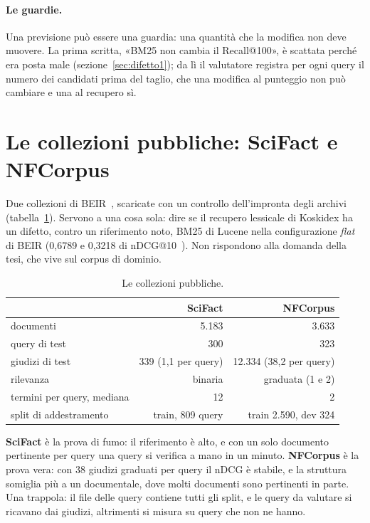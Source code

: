 \paragraph{Le guardie.} Una previsione può essere una guardia: una quantità che la
modifica non deve muovere. La prima scritta, «BM25 non cambia il Recall@100», è
scattata perché era posta male (sezione~\ref{sec:difetto1}); da lì il valutatore
registra per ogni query il numero dei candidati prima del taglio, che una modifica
al punteggio non può cambiare e una al recupero sì.

\section{Le collezioni pubbliche: SciFact e NFCorpus}\label{sec:collezioni}

Due collezioni di BEIR~\cite{thakur2021beir}, scaricate con un controllo
dell'impronta degli archivi (tabella~\ref{tab:collezioni}). Servono a una cosa
sola: dire se il recupero lessicale di Koskidex ha un difetto, contro un
riferimento noto, BM25 di Lucene nella configurazione \emph{flat} di BEIR
(0,6789 e 0,3218 di nDCG@10~\cite{pyserini2cr}). Non rispondono alla domanda
della tesi, che vive sul corpus di dominio.

\begin{table}[ht]
  \centering
  \begin{tabular}{lrr}
    \toprule
    & SciFact & NFCorpus \\
    \midrule
    documenti & 5.183 & 3.633 \\
    query di test & 300 & 323 \\
    giudizi di test & 339 (1,1 per query) & 12.334 (38,2 per query) \\
    rilevanza & binaria & graduata (1 e 2) \\
    termini per query, mediana & 12 & 2 \\
    split di addestramento & train, 809 query & train 2.590, dev 324 \\
    \bottomrule
  \end{tabular}
  \caption{Le collezioni pubbliche.}
  \label{tab:collezioni}
\end{table}

\textbf{SciFact} è la prova di fumo: il riferimento è alto, e con un solo
documento pertinente per query una query si verifica a mano in un minuto.
\textbf{NFCorpus} è la prova vera: con 38 giudizi graduati per query il nDCG è
stabile, e la struttura somiglia più a un documentale, dove molti documenti sono
pertinenti in parte. Una trappola: il file
delle query contiene tutti gli split, e le query da valutare si ricavano dai
giudizi, altrimenti si misura su query che non ne hanno.

